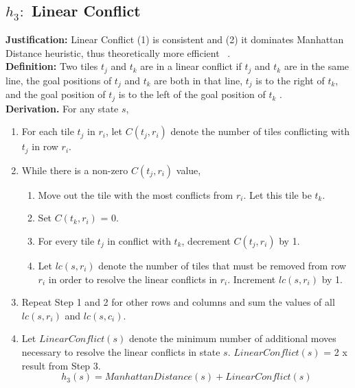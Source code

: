 \documentclass[runningheads]{llncs}
\begin{document}
\subsection{ \(h_3: \) Linear Conflict}
\textbf{Justification:} Linear Conflict (1) is consistent and (2) it dominates Manhattan Distance heuristic, thus theoretically more efficient ~\cite[104]{stuart_russell_artifical_2010}. \\
\textbf{Definition:} Two tiles \( t_j \) and \( t_k \) are in a linear conflict if \( t_j \) and \( t_k \) are in the same line, 
the goal positions of \( t_j \) and \( t_k \) are both in that line, 
\( t_j \) is to the right of \( t_k \), and the goal position of \( t_j \) is to the left of the goal position of \( t_k \) \cite[p13]{othar_hansson_generating_1985}. \\
\textbf{Derivation.} For any state \( s \),
\begin{enumerate}
    \item For each tile \( t_j \) in \( r_i \), let \( C(t_j, r_i) \) denote the number of tiles conflicting with \( t_j \) in row \( r_i \).
    \item While there is a non-zero \( C(t_j, r_i) \) value, 
    \begin{enumerate}
        \item Move out the tile with the most conflicts from \( r_i \). Let this tile be \( t_k \).
        \item Set \( C(t_k, r_i) \) = 0.
        \item For every tile \( t_j \) in conflict with \( t_k \), decrement \( C(t_j, r_i) \) by 1.
        \item Let \( lc(s, r_i) \) denote the number of tiles that must be removed from row \( r_i \) in order to resolve the linear conflicts in \( r_i \). Increment \( lc(s, r_i) \) by 1.
    \end{enumerate}
    \item Repeat Step 1 and 2 for other rows and columns and sum the values of all \( lc (s, r_i) \) and \( lc(s, c_i) \).
    \item Let \( LinearConflict(s) \) denote the minimum number of additional moves necessary to resolve the linear conflicts in state \( s \). \( LinearConflict(s) \) = 2 x result from Step 3.
    \[
        h_3(s) = ManhattanDistance(s) + LinearConflict(s)
    \]
\end{enumerate}
\end{document}

